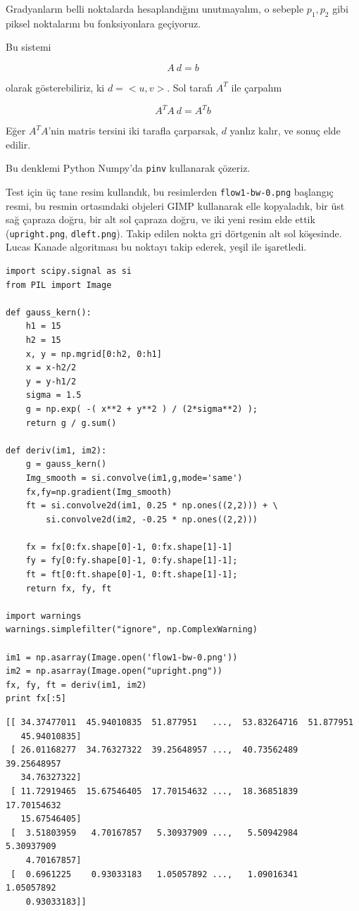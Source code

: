 \documentclass[12pt,fleqn]{article}\usepackage{../../common}
\begin{document}
Gradyanların belli noktalarda hesaplandığını unutmayalım, o sebeple $p_1,
p_2$ gibi piksel noktalarını bu fonksiyonlara geçiyoruz. 

Bu sistemi

$$ A \ d = b $$

olarak gösterebiliriz, ki $d = <u,v>$. Sol tarafı $A^T$ ile çarpalım

$$ A^TA \ d = A^Tb $$

Eğer $A^TA$'nin matris tersini iki tarafla çarparsak, $d$ yanlız kalır, ve
sonuç elde edilir. 

Bu denklemi Python Numpy'da \verb!pinv! kullanarak çözeriz.

Test için üç tane resim kullandık, bu resimlerden \verb!flow1-bw-0.png!
başlangıç resmi, bu resmin ortasındaki objeleri GIMP kullanarak elle kopyaladık,
bir üst sağ çapraza doğru, bir alt sol çapraza doğru, ve iki yeni resim elde
ettik (\verb!upright.png!, \verb!dleft.png!). Takip edilen nokta gri dörtgenin
alt sol köşesinde. Lucas Kanade algoritması bu noktayı takip ederek, yeşil ile
işaretledi.

\begin{verbatim}
import scipy.signal as si
from PIL import Image

def gauss_kern():
    h1 = 15
    h2 = 15
    x, y = np.mgrid[0:h2, 0:h1]
    x = x-h2/2
    y = y-h1/2
    sigma = 1.5
    g = np.exp( -( x**2 + y**2 ) / (2*sigma**2) );
    return g / g.sum()

def deriv(im1, im2):
    g = gauss_kern()
    Img_smooth = si.convolve(im1,g,mode='same')
    fx,fy=np.gradient(Img_smooth)    
    ft = si.convolve2d(im1, 0.25 * np.ones((2,2))) + \
        si.convolve2d(im2, -0.25 * np.ones((2,2)))
                    
    fx = fx[0:fx.shape[0]-1, 0:fx.shape[1]-1]    
    fy = fy[0:fy.shape[0]-1, 0:fy.shape[1]-1];
    ft = ft[0:ft.shape[0]-1, 0:ft.shape[1]-1];
    return fx, fy, ft

import warnings
warnings.simplefilter("ignore", np.ComplexWarning)

im1 = np.asarray(Image.open('flow1-bw-0.png'))
im2 = np.asarray(Image.open("upright.png"))
fx, fy, ft = deriv(im1, im2)
print fx[:5]
\end{verbatim}

\begin{verbatim}
[[ 34.37477011  45.94010835  51.877951   ...,  53.83264716  51.877951
   45.94010835]
 [ 26.01168277  34.76327322  39.25648957 ...,  40.73562489  39.25648957
   34.76327322]
 [ 11.72919465  15.67546405  17.70154632 ...,  18.36851839  17.70154632
   15.67546405]
 [  3.51803959   4.70167857   5.30937909 ...,   5.50942984   5.30937909
    4.70167857]
 [  0.6961225    0.93033183   1.05057892 ...,   1.09016341   1.05057892
    0.93033183]]
\end{verbatim}
\end{document}

